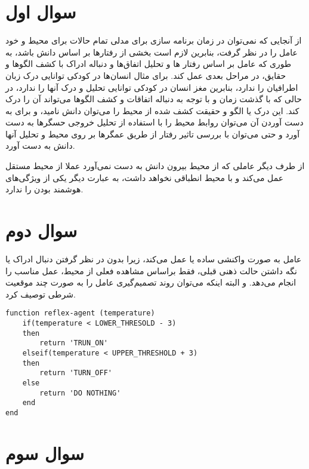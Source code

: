 \documentclass{article}
\begin{document}
\section*{سوال اول}
از آنجایی که نمی‌توان در زمان برنامه‌ سازی برای مدلی تمام حالات برای محیط و خود عامل را در نظر گرفت، بنابرین لازم است بخشی از رفتار‌ها بر اساس دانش باشد، به طوری که عامل بر اساس رفتار ها و تحلیل اتفاق‌ها و دنباله ادراک با کشف الگو‌ها و حقایق، در مراحل بعدی عمل کند. برای مثال انسان‌ها در کودکی توانایی درک زبان اطرافیان را ندارد، بنابرین مغز انسان در کودکی توانایی تحلیل و درک آنها را ندارد، در حالی که با گذشت زمان و با توجه به دنباله اتفاقات و کشف الگوها می‌تواند آن‌ را درک کند. این درک یا الگو و حقیقت کشف شده از محیط را ‌می‌توان دانش نامید، و برای به دست آوردن آن می‌توان روابط محیط را با استفاده از تحلیل خروجی حسگر‌ها به دست آورد و حتی می‌توان ‌با بررسی تاثیر رفتار از طریق عمگرها بر روی محیط و تحلیل آنها دانش به دست آورد.

از طرف دیگر عاملی که از محیط بیرون دانش به دست نمی‌‌آورد عملا از محیط مستقل عمل می‌کند و با محیط انطباقی نخواهد داشت، به عبارت دیگر یکی از ویژگی‌های هوشمند بودن را ندارد.

\section*{سوال دوم}
عامل به صورت واکنشی ساده یا 
 عمل می‌کند، زیرا بدون در نظر گرفتن دنبال ادراک یا نگه داشتن حالت ذهنی قبلی، فقط براساس مشاهده فعلی از محیط، عمل مناسب را انجام می‌دهد. و البته اینکه می‌توان روند تصمیم‌گیری عامل را به صورت چند موقعیت شرطی توصیف کرد.

\begin{latin}
\begin{lstlisting}
function reflex-agent (temperature)
	if(temperature < LOWER_THRESOLD - 3)
	then 
		return 'TRUN_ON'
	elseif(temperature < UPPER_THRESHOLD + 3) 
	then 
		return 'TURN_OFF'
	else
		return 'DO NOTHING'
	end
end
\end{lstlisting}
\end{latin}

\section*{سوال سوم}
\end{document}
